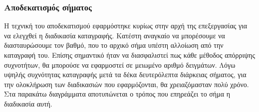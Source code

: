 \documentclass[breaklines=true, 12pt]{article}
\begin{document}
\subsubsection{Αποδεκατισμός σήματος}
\label{sec:org61dec40}
\label{sec:decimation-chapter}
Η τεχνική του αποδεκατισμού εφαρμόστηκε κυρίως στην αρχή της επεξεργασίας
για να ελεγχθεί η διαδικασία καταγραφής. Κατέστη αναγκαίο να μπορέσουμε
να διασταυρώσουμε τον βαθμό, που το αρχικό σήμα υπέστη αλλοίωση από την
καταγραφή του. Επίσης σημαντικό ήταν να διασφαλιστεί πως κάθε μέθοδος
απόρριψης συχνοτήτων, θα μπορούσε να εφαρμοστεί σε μειωμένο αριθμό
δειγμάτων. Λόγω υψηλής συχνότητας καταγραφής μετά τα δέκα δευτερόλεπτα
διάρκειας σήματος, για την ολοκλήρωση των διαδικασιών που εφαρμόζονται, θα
χρειαζόμασταν πολύ χρόνο. Στα παρακάτω διαγράμματα αποτυπώνεται ο τρόπος
που επηρεάζει το σήμα η διαδικασία αυτή.
\end{document}
